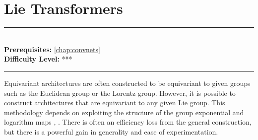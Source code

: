 \documentclass[book.tex]{subfiles}
\begin{document}
\chapter{Lie Transformers}

\label{chap:lie_transformers}
\noindent\rule{11cm}{0.4pt} \\
\textbf{Prerequisites:}  \autoref{chap:convnets} \\
\textbf{Difficulty Level:} *** \\
\noindent\rule{11cm}{0.4pt}
\vspace{5mm}

Equivariant architectures are often constructed to be equivariant to given groups such as the Euclidean group or the Lorentz group. However, it is possible to construct architectures that are equivariant to any given Lie group. This methodology depends on exploiting the structure of the group exponential and logarithm maps \cite{hutchinson2021lietransformer}, \cite{finzi2020generalizing}. There is often an efficiency loss from the general construction, but there is a powerful gain in generality and ease of experimentation.

\end{document}
